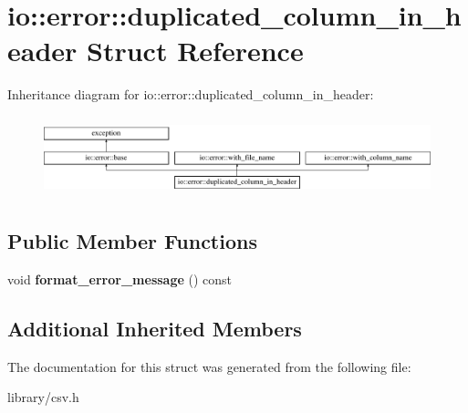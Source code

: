 \hypertarget{structio_1_1error_1_1duplicated__column__in__header}{}\section{io\+:\+:error\+:\+:duplicated\+\_\+column\+\_\+in\+\_\+header Struct Reference}
\label{structio_1_1error_1_1duplicated__column__in__header}
Inheritance diagram for io\+:\+:error\+:\+:duplicated\+\_\+column\+\_\+in\+\_\+header\+:\begin{figure}[H]
\begin{center}
\leavevmode
\includegraphics[height=2.333333cm]{structio_1_1error_1_1duplicated__column__in__header}
\end{center}
\end{figure}
\subsection*{Public Member Functions}
\begin{DoxyCompactItemize}
\item 
\mbox{\label{structio_1_1error_1_1duplicated__column__in__header_a213825695d770d3ee2ee7bb9a2bfa818}} 
void {\bfseries format\+\_\+error\+\_\+message} () const
\end{DoxyCompactItemize}
\subsection*{Additional Inherited Members}


The documentation for this struct was generated from the following file\+:\begin{DoxyCompactItemize}
\item 
library/csv.\+h\end{DoxyCompactItemize}
